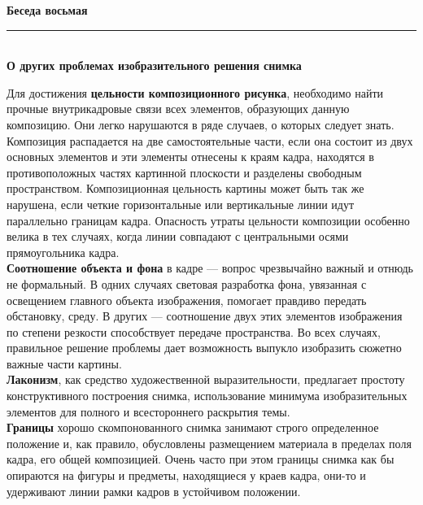 \documentclass{article}
\newcommand{\important}[1]{\textbf{#1}}
\renewcommand{\section}[2]{
	\vspace{6em}
	\begin{flushright}
		\Large
		\baselineskip=0.5\baselineskip
		\textbf{#1}
		\\
		\rule[0.5\baselineskip]{\textwidth}{0.15pt}
		\\
		\textbf{#2}
	\end{flushright}
}
\begin{document}
\section{Беседа восьмая}{О других проблемах изобразительного решения снимка}
Для достижения \important{цельности композиционного рисунка}, необходимо найти прочные внутрикадровые связи всех элементов, образующих данную композицию. Они легко нарушаются в ряде случаев, о которых следует знать. Композиция распадается на две самостоятельные части, если она состоит из двух основных элементов и эти элементы отнесены к краям кадра, находятся в противоположных частях картинной плоскости и разделены свободным пространством. Композиционная цельность картины может быть так же нарушена, если четкие горизонтальные или вертикальные линии идут параллельно границам кадра. Опасность утраты цельности композиции особенно велика в тех случаях, когда линии совпадают с центральными осями прямоугольника кадра.\\
\important{Соотношение объекта и фона} в кадре --- вопрос чрезвычайно важный и отнюдь не формальный. В одних случаях световая разработка фона, увязанная с освещением главного объекта изображения, помогает правдиво передать обстановку, среду. В других --- соотношение двух этих элементов изображения по степени резкости способствует передаче пространства. Во всех случаях, правильное решение проблемы дает возможность выпукло изобразить сюжетно важные части картины.\\
\important{Лаконизм}, как средство художественной выразительности, предлагает простоту конструктивного построения снимка, использование минимума изобразительных элементов для полного и всестороннего раскрытия темы.\\
\important{Границы} хорошо скомпонованного снимка занимают строго определенное положение и, как правило, обусловлены размещением материала в пределах поля кадра, его общей композицией. Очень часто при этом границы снимка как бы опираются на фигуры и предметы, находящиеся у краев кадра, они-то и удерживают линии рамки кадров в устойчивом положении.
\end{document}
